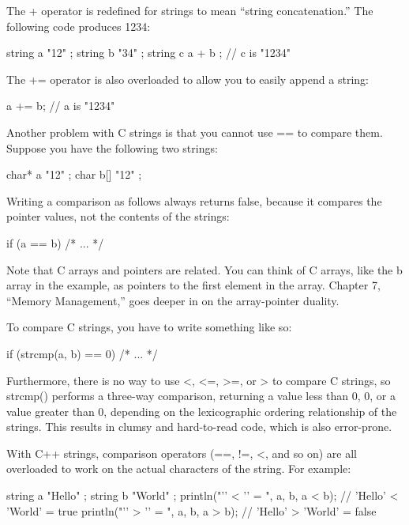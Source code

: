 
The + operator is redefined for strings to mean “string concatenation.” The following code produces 1234:

\begin{cpp}
string a { "12" };
string b { "34" };
string c { a + b }; // c is "1234"
\end{cpp}

The += operator is also overloaded to allow you to easily append a string:

\begin{cpp}
a += b; // a is "1234"
\end{cpp}


Another problem with C strings is that you cannot use == to compare them. Suppose you have the following two strings:

\begin{cpp}
char* a { "12" };
char b[] { "12" };
\end{cpp}

Writing a comparison as follows always returns false, because it compares the pointer values, not the contents of the strings:

\begin{cpp}
if (a == b) { /* ... */ }
\end{cpp}

Note that C arrays and pointers are related. You can think of C arrays, like the b array in the example, as pointers to the first element in the array. Chapter 7, “Memory Management,” goes deeper in on the array-pointer duality.

To compare C strings, you have to write something like so:

\begin{cpp}
if (strcmp(a, b) == 0) { /* ... */ }
\end{cpp}

Furthermore, there is no way to use <, <=, >=, or > to compare C strings, so strcmp() performs a three-way comparison, returning a value less than 0, 0, or a value greater than 0, depending on the lexicographic ordering relationship of the strings. This results in clumsy and hard-to-read code, which is also error-prone.

With C++ strings, comparison operators (==, !=, <, and so on) are all overloaded to work on the actual characters of the string. For example:

\begin{cpp}
string a { "Hello" };
string b { "World" };
println("'{}' < '{}' = {}", a, b, a < b); // 'Hello' < 'World' = true
println("'{}' > '{}' = {}", a, b, a > b); // 'Hello' > 'World' = false
\end{cpp}

